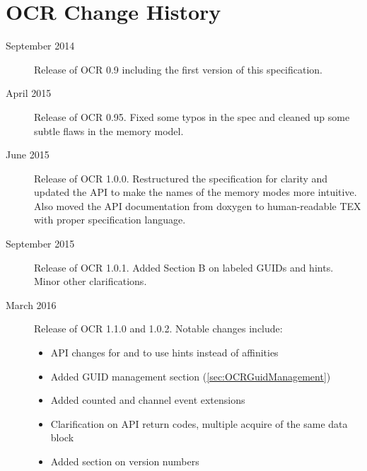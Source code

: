 %

\chapter{OCR Change  History}
\label{chap:OCR Change History}
\label{chap:Appendix D}
\begin{description}
\item[September 2014] Release of OCR 0.9 including the first version
  of this specification.
\item[April 2015] Release of OCR 0.95.  Fixed some typos in the spec and
cleaned up some subtle flaws in the memory model.
\item[June 2015] Release of OCR 1.0.0. Restructured the specification for clarity and
updated the API to make the names of the memory modes more intuitive. Also moved
the API documentation from doxygen to human-readable TEX with proper specification
language.
\item[September 2015] Release of OCR 1.0.1. Added Section B on labeled GUIDs and
hints. Minor other clarifications.
\item[March 2016] Release of OCR 1.1.0 and 1.0.2. Notable changes include:
\begin{itemize}
\item{API changes for  and  to
  use hints instead of affinities}
\item{Added GUID management section (\ref{sec:OCRGuidManagement})}
\item{Added counted and channel event extensions}
\item{Clarification on API return codes, multiple acquire of the same
  data block}
\item{Added section on version numbers}
\end{itemize}
\end{description}

